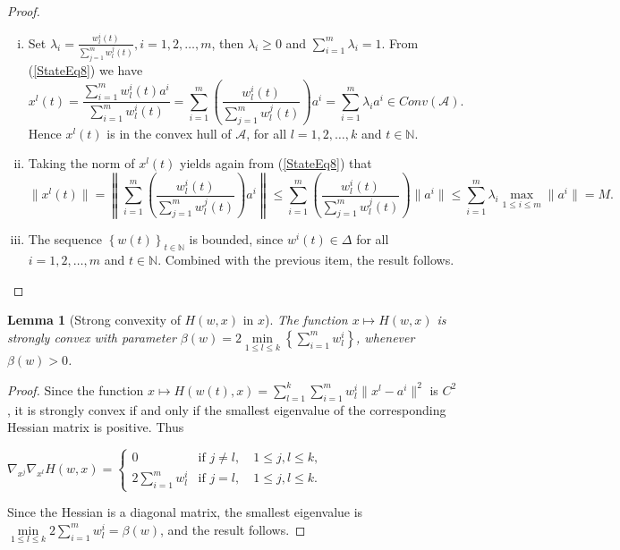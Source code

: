 \documentclass[11pt]{article}
\numberwithin{equation}{section}
\newtheorem{lemma}{Lemma}[proposition]
\begin{document}
\begin{proof}
\begin{enumerate}[(i)]
	\item  Set $\lambda_i = \frac{ w^i_l(t)}{\sum_{j=1}^{m} w^j_l(t)}, i=1, 2, \ldots ,m$, then $\lambda_i \geq 0$ and $\sum\limits_{i=1}^{m} \lambda_i = 1$. From (\ref{StateEq8}) we have
	\begin{equation*}
		x^l(t) = \frac{\sum_{i=1}^{m} w^i_l(t) a^i}{\sum_{i=1}^{m} w^i_l(t)} 
		= \sum_{i=1}^{m} \left( \frac{ w^i_l(t)}{\sum_{j=1}^{m} w^j_l(t)} \right) a^i 
		= \sum\limits_{i=1}^{m} \lambda_i a^i \in Conv(\mathcal{A}).
	\end{equation*}
	Hence $x^l(t)$ is in the convex hull of $\mathcal{A}$, for all $l = 1, 2, \ldots, k$ and $t \in \mathbb{N}$.

	\item
	Taking the norm of $x^l(t)$ yields again from (\ref{StateEq8}) that
	\begin{equation*}
		\| x^l(t) \| = \left\lVert \sum_{i=1}^{m} \left( \frac{ w^i_l(t)}{\sum_{j=1}^{m} w^j_l(t)} \right) a^i \right\lVert
		\leq \sum_{i=1}^{m} \left( \frac{ w^i_l(t)}{\sum_{j=1}^{m} w^j_l(t)} \right) \| a^i \|
		\leq \sum_{i=1}^{m} \lambda_i \max\limits_{1 \leq i \leq m} \| a^i \| = M .
	\end{equation*}
	\item The sequence $\left\lbrace w(t) \right\rbrace_{t \in \mathbb{N}}$ is bounded, since $w^i(t) \in \Delta$ for all $i=1, 2, \ldots ,m$ and $t \in \mathbb{N}$. Combined with the previous item, the result follows.
\end{enumerate} 
\end{proof}

\begin{lemma}[Strong convexity of $H(w,x)$ in $x$] \label{StateEq14}
The function $x \mapsto H(w,x)$ is strongly convex with parameter $\beta(w) = 2 \min\limits_{1 \leq l \leq k} \left\lbrace \sum\limits_{i=1}^{m} w^i_l\right \rbrace$, whenever $\beta(w) > 0$.
\end{lemma}

\begin{proof}
Since the function $x \mapsto H(w(t),x) = 
\sum\limits_{l=1}^{k} \sum\limits_{i=1}^{m} w^i_l \|x^l - a^i\|^2$ is $C^2$, it is strongly convex if and only if the smallest eigenvalue of the corresponding Hessian matrix is positive. Thus

\begin{center}
$\nabla_{x^j} \nabla_{x^l} H(w,x) = 
\begin{cases} 0 &\mbox{if } j \neq l, \quad 1 \leq j,l \leq k ,
\\ 2\sum\limits_{i=1}^{m} w^i_l &\mbox{if } j = l, \quad 1 \leq j,l \leq k. \end{cases} $
\end{center}

Since the Hessian is a diagonal matrix, the smallest eigenvalue is $\min\limits_{1 \leq l \leq k} 2\sum\limits_{i=1}^{m} w^i_l = \beta(w)$, and the result follows.
\end{proof}
\end{document}
